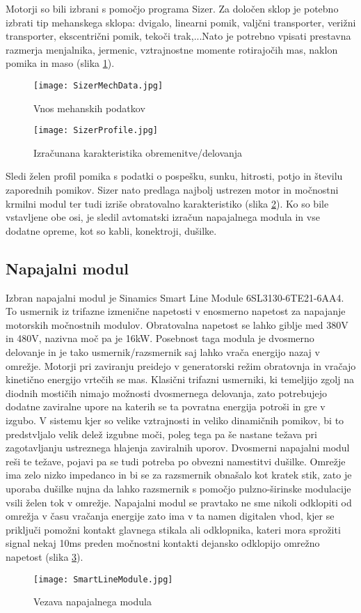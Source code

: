 \documentclass[a4paper,twoside,openright,12pt]{book}
\begin{document}
{Motorji so bili izbrani s pomočjo programa Sizer. Za določen sklop je potebno izbrati tip mehanskega sklopa: dvigalo, linearni pomik, valjčni transporter, verižni transporter, ekscentrični pomik, tekoči trak,...Nato je potrebno vpisati prestavna razmerja menjalnika, jermenic, vztrajnostne momente rotirajočih mas, naklon pomika in maso (slika \ref{zaga_sizermeh}).\\
\begin{figure}[h]
	\centering
	\texttt{[image: SizerMechData.jpg]}
	\caption{\label{zaga_sizermeh} Vnos mehanskih podatkov}
\end{figure} 
\begin{figure}[h]
	\centering
	\texttt{[image: SizerProfile.jpg]}
	\caption{\label{zaga_sizerizhod} Izračunana karakteristika obremenitve/delovanja}
\end{figure}
Sledi želen profil pomika s podatki o pospešku, sunku, hitrosti, potjo in številu zaporednih pomikov. Sizer nato predlaga najbolj ustrezen motor in močnostni krmilni modul ter tudi izriše obratovalno karakteristiko (slika \ref{zaga_sizerizhod}). Ko so bile vstavljene obe osi, je sledil avtomatski izračun napajalnega modula in vse dodatne opreme, kot so kabli, konektroji, dušilke.
\subsection{Napajalni modul}
Izbran napajalni modul je Sinamics Smart Line Module 6SL3130-6TE21-6AA4. To usmernik iz trifazne izmenične napetosti v enosmerno napetost za napajanje motorskih močnostnih modulov. Obratovalna napetost se lahko giblje med 380V in 480V, nazivna moč pa je 16kW. Posebnost taga modula je dvosmerno delovanje in je tako usmernik/razsmernik saj lahko vrača energijo nazaj v omrežje. Motorji pri zaviranju preidejo v generatorski režim obratovnja in vračajo kinetično energijo vrtečih se mas. Klasični trifazni usmerniki, ki temeljijo zgolj na diodnih mostičih nimajo možnosti dvosmernega delovanja, zato potrebujejo dodatne zaviralne upore na katerih se ta povratna energija potroši in gre v izgubo. V sistemu kjer so velike vztrajnosti in veliko dinamičnih pomikov, bi to predstvljalo velik delež izgubne moči, poleg tega pa še nastane težava pri zagotavljanju ustreznega hlajenja zaviralnih uporov. Dvosmerni napajalni modul reši te težave, pojavi pa se tudi potreba po obvezni namestitvi dušilke. Omrežje ima zelo nizko impedanco in bi se za razsmernik obnašalo kot kratek stik, zato je  uporaba dušilke nujna da lahko razsmernik s pomočjo pulzno-širinske modulacije vsili želen tok v omrežje. Napajalni modul se pravtako ne sme nikoli odklopiti od omrežja v času vračanja energije zato ima v ta namen digitalen vhod, kjer se priključi pomožni kontakt glavnega stikala ali odklopnika, kateri mora sprožiti signal nekaj 10ms preden močnostni kontakti dejansko odklopijo omrežno napetost (slika \ref{zaga_napajlnik}).\\
\begin{figure}[htb]
	\centering
	\texttt{[image: SmartLineModule.jpg]}
	\caption{\label{zaga_napajlnik} Vezava napajalnega modula \cite{S120PowerModule}}
\end{figure}
}
\end{document}
